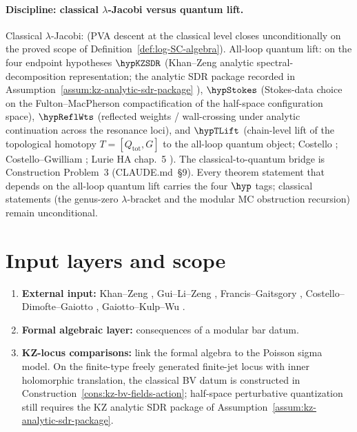 \providecommand{\Tr}{\operatorname{Tr}}
\providecommand{\Def}{\operatorname{Def}}
\label{ch:modular-pva-quantization}%
\label{chap:modular-pva}%
\label{def:complete-modular-bar}%

\paragraph{Discipline: classical $\lambda$-Jacobi versus quantum lift.}
Classical $\lambda$-Jacobi: \ClaimStatusProvedHere{} (PVA descent at
the classical level closes unconditionally on the proved scope of
Definition~\ref{def:log-SC-algebra}). All-loop quantum lift:
\ClaimStatusConditional{} on the four endpoint hypotheses
$\hypKZSDR$ (Khan--Zeng analytic spectral-decomposition representation;
the analytic SDR package recorded in
Assumption~\ref{assum:kz-analytic-sdr-package} \cite{KZ25}),
$\hypStokes$ (Stokes-data choice on the Fulton--MacPherson
compactification of the half-space configuration space),
$\hypReflWts$ (reflected weights / wall-crossing under analytic
continuation across the resonance loci), and $\hypTLift$
(chain-level lift of the topological homotopy
$T = [Q_{\mathrm{tot}}, G]$ to the all-loop quantum object;
Costello \cite{Costello2011Renorm}; Costello--Gwilliam \cite{CG17};
Lurie HA chap.~5 \cite{LurieHA}). The classical-to-quantum bridge is
Construction Problem~3 (CLAUDE.md~\S9). Every theorem statement that
depends on the all-loop quantum lift carries the four $\hyp$ tags;
classical statements (the genus-zero $\lambda$-bracket and the modular
MC obstruction recursion) remain unconditional.

\section{Input layers and scope}

\begin{convention}
\label{conv:three-levels}
\begin{enumerate}[leftmargin=2.4em]
\item \textbf{External input:} Khan--Zeng \cite{KZ25}, Gui--Li--Zeng \cite{GLZ22}, Francis--Gaitsgory \cite{FG12}, Costello--Dimofte--Gaiotto \cite{CDG20}, Gaiotto--Kulp--Wu \cite{GKW25}.
\item \textbf{Formal algebraic layer:} consequences of a modular bar datum.
\item \textbf{KZ-locus comparisons:} link the formal algebra to the Poisson sigma model. On the finite-type freely generated finite-jet locus with inner holomorphic translation, the classical BV datum is constructed in Construction~\ref{cons:kz-bv-fields-action}; half-space perturbative quantization still requires the KZ analytic SDR package of Assumption~\ref{assum:kz-analytic-sdr-package}.
\end{enumerate}
\end{convention}

